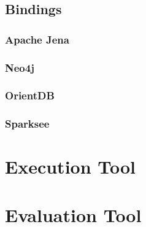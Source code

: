 \subsection{Bindings}

\subsubsection{Apache Jena}

\subsubsection{Neo4j}

\subsubsection{OrientDB}

\subsubsection{Sparksee}

\section{Execution Tool}

\section{Evaluation Tool}
